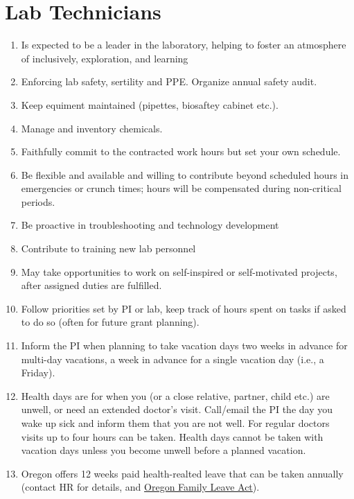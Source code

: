 \documentclass[12pt]{article}
\begin{document}
\section{Lab Technicians}
\begin{enumerate}
\item Is expected to be a leader in the laboratory, helping to foster
  an atmosphere of inclusively, exploration, and learning
\item Enforcing lab safety, sertility and PPE. Organize annual safety audit. 
\item Keep equiment maintained (pipettes, biosaftey cabinet etc.). 
\item Manage and inventory chemicals. 
\item Faithfully commit to the contracted work hours but set your own schedule.
\item Be flexible and available and willing to contribute beyond
  scheduled hours in emergencies or crunch times; hours will be
  compensated during non-critical periods.
\item Be proactive in troubleshooting and technology development
\item Contribute to training new lab personnel
\item May take opportunities to work on self-inspired or self-motivated
  projects, after assigned duties are fulfilled.
\item Follow priorities set by PI or lab, keep track of hours spent on
  tasks if asked to do so (often for future grant planning).
\item Inform the PI when planning to take vacation days two weeks in
  advance for multi-day vacations, a week in advance for a single
  vacation day (i.e., a Friday).
\item Health days are for when you (or a close relative, partner,
  child etc.) are unwell, or need an extended doctor's
  visit. Call/email the PI the day you wake up sick and inform them
  that you are not well. For regular doctors visits up to four hours
  can be taken. Health days cannot be taken with vacation days unless
  you become unwell before a planned vacation.
\item Oregon offers 12 weeks paid health-realted leave that can be
  taken annually (contact HR for details, and
  \href{https://www.oregon.gov/boli/workers/pages/oregon-family-leave.aspx}{Oregon
    Family Leave Act}).
\end{enumerate}
\end{document}
